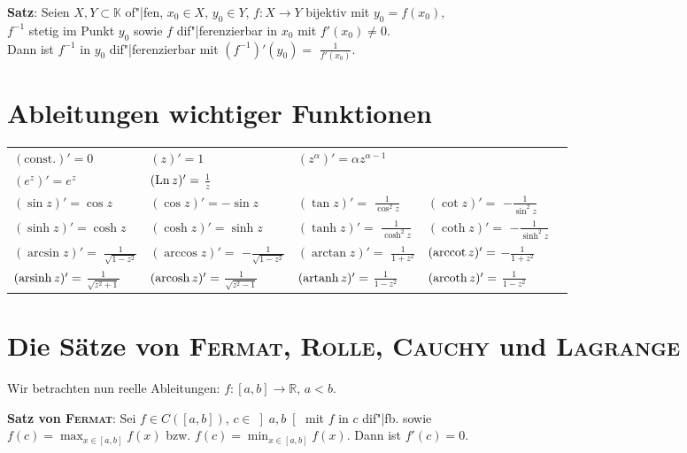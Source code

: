 \textbf{Satz}:
Seien $X, Y \subset \mathbb{K}$ of"|fen, $x_0 \in X$, $y_0 \in Y$,
$f: X \rightarrow Y$ bijektiv mit $y_0 = f(x_0)$, \\
$f^{-1}$ stetig im Punkt $y_0$ sowie $f$ dif"|ferenzierbar in $x_0$ mit
$f'(x_0) \not= 0$. \\
Dann ist $f^{-1}$ in $y_0$ dif"|ferenzierbar mit
$(f^{-1})'(y_0) =$ {\large $\frac{1}{f'(x_0)}$}.

\section{%
    Ableitungen wichtiger Funktionen%
}

\begin{tabular}{lllll}
    $(\text{const.})' = 0$ &
    $(z)' = 1$ &
    $(z^\alpha)' = \alpha z^{\alpha - 1}$ \\
    $(e^z)' = e^z$ &
    $(\operatorname{Ln} z)' =$ {\large $\frac{1}{z}$}  \\ \hline
    $(\sin z)' = \cos z$ &
    $(\cos z)' = -\sin z$ &
    $(\tan z)' =$ {\large $\frac{1}{\cos^2 z}$} &
    $(\cot z)' =$ {\large $-\frac{1}{\sin^2 z}$} \\
    $(\sinh z)' = \cosh z$ &
    $(\cosh z)' = \sinh z$ &
    $(\tanh z)' =$ {\large $\frac{1}{\cosh^2 z}$} &
    $(\coth z)' =$ {\large $-\frac{1}{\sinh^2 z}$} \\ \hline
    $(\arcsin z)' =$ {\large $\frac{1}{\sqrt{1 - z^2}}$} &
    $(\arccos z)' =$ {\large $-\frac{1}{\sqrt{1 - z^2}}$} &
    $(\arctan z)' =$ {\large $\frac{1}{1 + z^2}$} &
    $(\operatorname{arccot} z)' =$ {\large $-\frac{1}{1 + z^2}$} \\
    $(\operatorname{arsinh} z)' =$ {\large $\frac{1}{\sqrt{z^2 + 1}}$} &
    $(\operatorname{arcosh} z)' =$ {\large $\frac{1}{\sqrt{z^2 - 1}}$} &
    $(\operatorname{artanh} z)' =$ {\large $\frac{1}{1 - z^2}$} &
    $(\operatorname{arcoth} z)' =$ {\large $\frac{1}{1 - z^2}$}
\end{tabular}

\section{%
    Die Sätze von \textsc{Fermat}, \textsc{Rolle}, \textsc{Cauchy} und
    \textsc{Lagrange}%
}

Wir betrachten nun reelle Ableitungen: $f: [a,b] \rightarrow \mathbb{R}$,
$a < b$.

\textbf{Satz von \textsc{Fermat}}:
Sei $f \in C([a,b])$,
$c \in \left]a,b\right[$ mit $f$ in $c$ dif"|fb. sowie \\
$f(c) = \max_{x \in [a,b]} f(x)$ bzw. $f(c) = \min_{x \in [a,b]} f(x)$. \qquad
Dann ist $f'(c) = 0$.

